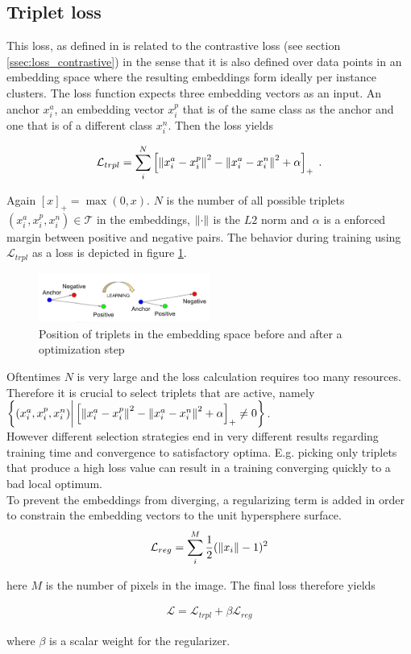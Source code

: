 \subsection{Triplet loss}\label{ssec:loss_triplet}
This loss, as defined in \cite{Schroff_2015} is related to the contrastive loss (see section \ref{ssec:loss_contrastive}) in the sense that it is also defined over data points in an embedding space where the resulting embeddings form ideally per instance clusters. The loss function expects three embedding vectors as an input. An anchor $x_i^a$, an embedding vector $x_i^p$ that is of the same class as the anchor and one that is of a different class $x_i^n$. Then the loss yields

\begin{align}
	\mathcal{L}_{trpl} = \sum_i^N \left[ \left\lVert x_i^a - x_i^p\right\rVert^2 - \left\lVert x_i^a - x_i^n\right\rVert^2 + \alpha \right]_+ \text{\hspace{1mm}.}
\end{align} 

Again $[x]_+ = \max(0, x)$. $N$ is the number of all possible triplets $(x_i^a, x_i^p, x_i^n) \in \mathcal{T}$ in the embeddings, $\left\lVert\cdot\right\rVert$ is the $L2$ norm and $\alpha$ is a enforced margin between positive and negative pairs. The behavior during training using $\mathcal{L}_{trpl}$ as a loss is depicted in figure \ref{fig_triplet}. \\

\begin{figure}[ht!]
	\centering
	\includegraphics[width=0.5\textwidth]{figures/triplet_loss.png}
	\caption{\cite{Schroff_2015} Position of triplets in the embedding space before and after a optimization step}
	\label{fig_triplet}
\end{figure}

Oftentimes $N$ is very large and the loss calculation requires too many resources. Therefore it is crucial to select triplets that are active, namely $\left\{ (x_i^a, x_i^p, x_i^n) \bigg| \left[ \left\lVert x_i^a - x_i^p\right\rVert^2 - \left\lVert x_i^a - x_i^n\right\rVert^2 + \alpha \right]_+ \neq 0 \right\}$.\\  However different selection strategies end in very different results regarding training time and convergence to satisfactory optima. E.g. picking only triplets that produce a high loss value can result in a training converging quickly to a bad local optimum.\\
To prevent the embeddings from diverging, a regularizing term is added in order to constrain the embedding vectors to the unit hypersphere surface.
\begin{align}
	\mathcal{L}_{reg} = \sum_i^M\frac{1}{2}(\left\lVert x_i\right\rVert - 1)^2
\end{align}

here $M$ is the number of pixels in the image. The final loss therefore yields

\begin{align}
\mathcal{L} = \mathcal{L}_{trpl} + \beta \mathcal{L}_{reg}
\end{align}

where $\beta$ is a scalar weight for the regularizer.